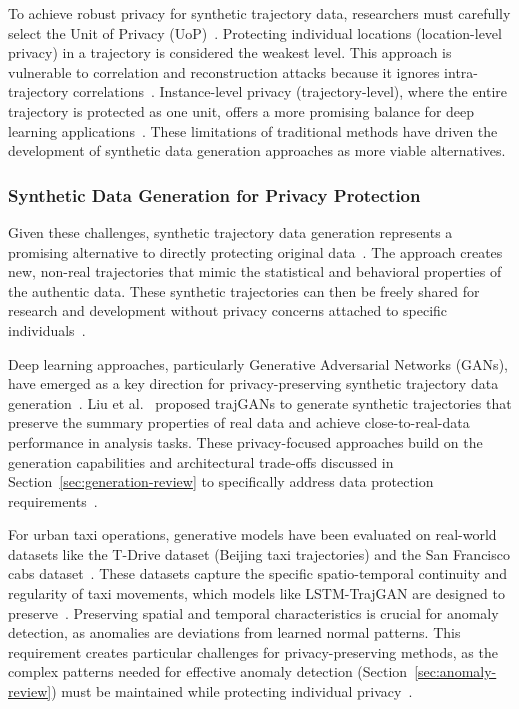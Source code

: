 \documentclass[runningheads]{llncs}
\begin{document}
To achieve robust privacy for synthetic trajectory data, researchers must carefully select the Unit of Privacy (UoP)~\cite{Buchholz2024SoK,Primault2019LongRoad}. Protecting individual locations (location-level privacy) in a trajectory is considered the weakest level. This approach is vulnerable to correlation and reconstruction attacks because it ignores intra-trajectory correlations~\cite{Buchholz2024SoK,Buchholz2022RAoPT,Primault2014DPLPP,Errounda2019AnalysisDPLocation}. Instance-level privacy (trajectory-level), where the entire trajectory is protected as one unit, offers a more promising balance for deep learning applications~\cite{Buchholz2024SoK}. These limitations of traditional methods have driven the development of synthetic data generation approaches as more viable alternatives.

\subsubsection{Synthetic Data Generation for Privacy Protection}

Given these challenges, synthetic trajectory data generation represents a promising alternative to directly protecting original data~\cite{Buchholz2024SoK,Rao2021LSTMTrajGAN,Liu2018TrajGANs}. The approach creates new, non-real trajectories that mimic the statistical and behavioral properties of the authentic data. These synthetic trajectories can then be freely shared for research and development without privacy concerns attached to specific individuals~\cite{Rao2021LSTMTrajGAN,Liu2018TrajGANs,Qu2020GANs5G}.

Deep learning approaches, particularly Generative Adversarial Networks (GANs), have emerged as a key direction for privacy-preserving synthetic trajectory data generation~\cite{Buchholz2024SoK,Liu2018TrajGANs,Rao2021LSTMTrajGAN,Qu2020GANs5G}. Liu et al.~\cite{Liu2018TrajGANs} proposed trajGANs to generate synthetic trajectories that preserve the summary properties of real data and achieve close-to-real-data performance in analysis tasks. These privacy-focused approaches build on the generation capabilities and architectural trade-offs discussed in Section~\ref{sec:generation-review} to specifically address data protection requirements~\cite{Rao2021LSTMTrajGAN,Qu2020GANs5G,Buchholz2024SoK,Ponomareva2023HowToDPfyML}.

For urban taxi operations, generative models have been evaluated on real-world datasets like the T-Drive dataset (Beijing taxi trajectories) and the San Francisco cabs dataset~\cite{Ma2021TrajectoryPrivacy,Primault2014DPLPP,Primault2019LongRoad}. These datasets capture the specific spatio-temporal continuity and regularity of taxi movements, which models like LSTM-TrajGAN are designed to preserve~\cite{Rao2021LSTMTrajGAN,Liu2018TrajGANs,Jin2023SurveyExpStudy}. Preserving spatial and temporal characteristics is crucial for anomaly detection, as anomalies are deviations from learned normal patterns. This requirement creates particular challenges for privacy-preserving methods, as the complex patterns needed for effective anomaly detection (Section~\ref{sec:anomaly-review}) must be maintained while protecting individual privacy~\cite{Rao2021LSTMTrajGAN,Naghizade2020PrivacyContextAware}.
\end{document}
